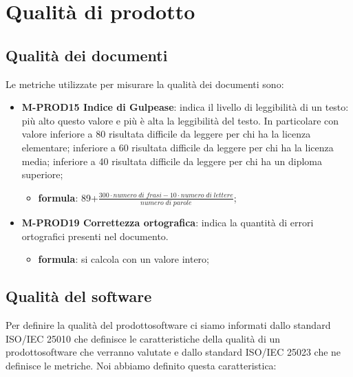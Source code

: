 \appendix
\section{Qualità di prodotto}
	\subsection{Qualità dei documenti}
	Le metriche utilizzate per misurare la qualità dei documenti sono:
	\begin{itemize}
		\item \textbf{M-PROD15 Indice di Gulpease}: indica il livello di leggibilità di un testo: più alto questo valore e più è alta la leggibilità del testo. In particolare con valore inferiore a 80 risultata difficile da leggere per chi ha la licenza elementare; inferiore a 60 risultata difficile da leggere per chi ha la licenza media; inferiore a 40 risultata difficile da leggere per chi ha un diploma superiore;
		\begin{itemize}
			\item[] \textbf{formula}: 89+$\frac{300\cdot numero \; di \; frasi-10\cdot numero \; di \; lettere}{numero \; di \; parole}$;
		\end{itemize}                	
		\item \textbf{M-PROD19 Correttezza ortografica}: indica la quantità di errori ortografici presenti nel documento.
		\begin{itemize}
			\item[] \textbf{formula}: si calcola con un valore intero;
		\end{itemize}
	\end{itemize}
	\subsection{Qualità del software} 
	Per definire la qualità del prodotto\glosp software ci siamo informati dallo standard ISO/IEC 25010 che definisce le caratteristiche della qualità di un prodotto\glosp software che verranno valutate e dallo standard ISO/IEC 25023 che ne definisce le metriche. Noi abbiamo definito questa caratteristica:
